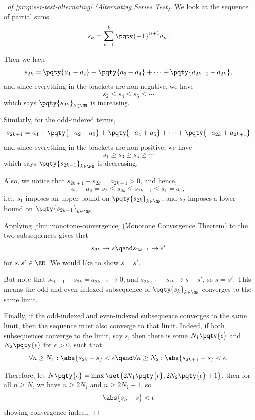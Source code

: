 \begin{proof}[\proofname\ of \autoref{prop:ser-test-alternating} (Alternating Series Test)]
    We look at the sequence of partial sums
    \[
        s_k = \sum_{n = 1}^{k} \pqty{-1}^{n + 1} a_n.
    \]
    
    Then we have
    \[
        s_{2k} = \pqty{a_1 - a_2} + \pqty{a_3 - a_4} + \cdots + \pqty{a_{2k - 1} - a_{2k}},
    \]
    and since everything in the brackets are non-negative, we have
    \[
        s_2 \leq s_4 \leq s_6 \leq \cdots
    \]
    which says \(\pqty{s_{2k}}_{k \in \NN}\) is increasing.

    Similarly, for the odd-indexed terms,
    \[
        s_{2k + 1} = a_1 + \pqty{- a_2 + a_3} + \pqty{- a_4 + a_5} + \cdots + \pqty{- a_{2k} + a_{2k + 1}}
    \]
    and since everything in the brackets are non-positive, we have
    \[
        s_1 \geq s_3 \geq s_5 \geq \cdots
    \]
    which says \(\pqty{s_{2k - 1}}_{k \in \NN}\) is decreasing.

    Also, we notice that \(s_{2k + 1} - s_{2k} = a_{2k + 1} > 0\), and hence,
    \[
        a_1 - a_2 = s_2 \leq s_{2k} \leq s_{2k + 1} \leq s_1 = a_1,
    \]
    i.e., \(s_1\) imposes an upper bound on \(\pqty{s_{2k}}_{k \in \NN}\), and \(s_2\) imposes a lower bound on \(\pqty{s_{2k - 1}}_{k \in \NN}\).
    
    Applying \autoref{thm:monotone-convergence} (Monotone Convergence Theorem) to the two subsequences gives that
    \[
        s_{2k} \to s \qand s_{2k - 1} \to s'
    \]
    for \(s, s' \in \RR\). We would like to show \(s = s'\).

    But note that \(s_{2k + 1} - s_{2k} = a_{2k + 1} \to 0\), and \(s_{2k + 1} - s_{2k} \to s - s'\), so \(s = s'\). This means the odd and even indexed subsequence of \(\pqty{s_k}_{k \in \NN}\) converges to the same limit.

    Finally, if the odd-indexed and even-indexed subsequence converges to the same limit, then the sequence must also converge to that limit. Indeed, if both subsequences converge to the limit, say \(s\), then there is some \(N_1\pqty{\epsilon}\) and \(N_2\pqty{\epsilon}\) for \(\epsilon > 0\), such that
    \[
        \forall n \geq N_1: \abs{s_{2k} - s} < \epsilon \qand \forall n \geq N_2: \abs{s_{2k + 1} - s} < \epsilon.
    \]

    Therefore, let \(N\pqty{\epsilon} = \max\set{2 N_1\pqty{\epsilon}, 2 N_2\pqty{\epsilon} + 1}\), then for all \(n \geq N\), we have \(n \geq 2 N_1\) and \(n \geq 2 N_2 + 1\), so
    \[
        \abs{s_n - s} < \epsilon
    \]
    showing convergence indeed.
\end{proof}

